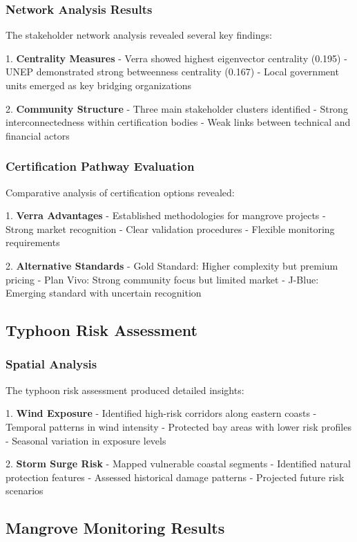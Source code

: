 \documentclass{article}
\theoremstyle{plain}
\theoremstyle{definition}
\theoremstyle{remark}
\begin{document}
\begin{multicols}{2}
\subsubsection{Network Analysis Results}
The stakeholder network analysis revealed several key findings:

1. \textbf{Centrality Measures}
   - Verra showed highest eigenvector centrality (0.195)
   - UNEP demonstrated strong betweenness centrality (0.167)
   - Local government units emerged as key bridging organizations

2. \textbf{Community Structure}
   - Three main stakeholder clusters identified
   - Strong interconnectedness within certification bodies
   - Weak links between technical and financial actors

\subsubsection{Certification Pathway Evaluation}
Comparative analysis of certification options revealed:

1. \textbf{Verra Advantages}
   - Established methodologies for mangrove projects
   - Strong market recognition
   - Clear validation procedures
   - Flexible monitoring requirements

2. \textbf{Alternative Standards}
   - Gold Standard: Higher complexity but premium pricing
   - Plan Vivo: Strong community focus but limited market
   - J-Blue: Emerging standard with uncertain recognition

\subsection{Typhoon Risk Assessment}

\subsubsection{Spatial Analysis}
The typhoon risk assessment produced detailed insights:

1. \textbf{Wind Exposure}
   - Identified high-risk corridors along eastern coasts
   - Temporal patterns in wind intensity
   - Protected bay areas with lower risk profiles
   - Seasonal variation in exposure levels

2. \textbf{Storm Surge Risk}
   - Mapped vulnerable coastal segments
   - Identified natural protection features
   - Assessed historical damage patterns
   - Projected future risk scenarios

\subsection{Mangrove Monitoring Results}


\end{multicols}
\end{document}

